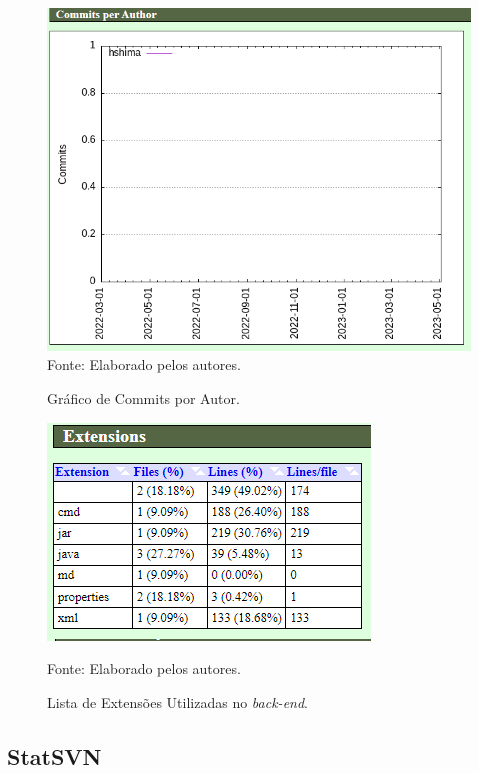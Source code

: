 \documentclass[
    12pt,               %
    openright,          %
    oneside,
    a4paper,            %
    BIBLATEX,           %
    TODO,               %
    english,            %
    brazil              %
    ]{ifsp-spo-inf-ctds}
\begin{document}
            \begin{figure}[H]
                \centering
                \caption{Gráfico de Commits por Autor.}
                \includegraphics[width=1 \textwidth]{Gitstats/back-end/commitsAutorBack.png}
                {\footnotesize Fonte: Elaborado pelos autores.}
                \label{fig:commitBack}
            \end{figure}    

            \begin{figure}[H]
                \centering
                \caption{Lista de Extensões Utilizadas no \emph{back-end}.}
                \includegraphics[scale = 1.2]{Gitstats/back-end/extensoesBack.png}

                {\footnotesize Fonte: Elaborado pelos autores.}
                \label{fig:extensoesBack}
            \end{figure}  


    \subsection{StatSVN}
\end{document}

